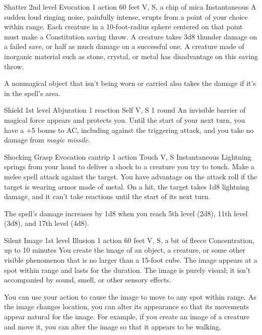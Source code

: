 \documentclass[10pt,a4paper,twoside,bg=print,twocolumn,openany,nodeprecatedcode]{dndbook}
\begin{document}
\DndSpellHeader%
{Shatter}
{2nd level Evocation}
{1 action}
{60 feet}
{V, S, a chip of mica}
{Instantaneous}
A sudden loud ringing noise, painfully intense, erupts from a point of your choice within range. Each creature in a 10-foot-radius sphere centered on that point must make a Constitution saving throw. A creature takes 3d8 thunder damage on a failed save, or half as much damage on a successful one. A creature made of inorganic material such as stone, crystal, or metal has disadvantage on this saving throw.

A nonmagical object that isn't being worn or carried also takes the damage if it's in the spell's area.



\DndSpellHeader%
{Shield}
{1st level Abjuration}
{1 reaction}
{Self}
{V, S}
{1 round}
An invisible barrier of magical force appears and protects you. Until the start of your next turn, you have a +5 bonus to AC, including against the triggering attack, and you take no damage from \textit{magic missile}.



\DndSpellHeader%
{Shocking Grasp}
{Evocation cantrip}
{1 action}
{Touch}
{V, S}
{Instantaneous}
Lightning springs from your hand to deliver a shock to a creature you try to touch. Make a melee spell attack against the target. You have advantage on the attack roll if the target is wearing armor made of metal. On a hit, the target takes 1d8 lightning damage, and it can't take reactions until the start of its next turn.

The spell's damage increases by 1d8 when you reach 5th level (2d8), 11th level (3d8), and 17th level (4d8).



\DndSpellHeader%
{Silent Image}
{1st level Illusion}
{1 action}
{60 feet}
{V, S, a bit of fleece}
{Concentration, up to 10 minutes}
You create the image of an object, a creature, or some other visible phenomenon that is no larger than a 15-foot cube. The image appears at a spot within range and lasts for the duration. The image is purely visual; it isn't accompanied by sound, smell, or other sensory effects.

You can use your action to cause the image to move to any spot within range. As the image changes location, you can alter its appearance so that its movements appear natural for the image. For example, if you create an image of a creature and move it, you can alter the image so that it appears to be walking.
\end{document}
